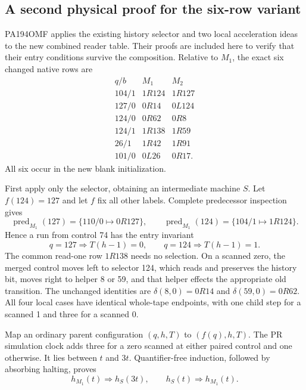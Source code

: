 \subsection{A second physical proof for the six-row variant}

PA194OMF applies the existing history selector and two local acceleration
ideas to the new combined reader table.  Their proofs are included here
to verify that their entry conditions survive the composition.  Relative
to $M_1$, the exact six changed native rows are
\[
\begin{array}{c|cc}
q/b&M_1&M_2\\\hline
104/1&1R124&1R127\\
127/0&0R14&0L124\\
124/0&0R62&0R8\\
124/1&1R138&1R59\\
26/1&1R42&1R91\\
101/0&0L26&0R17.
\end{array}                                                  \tag{OM18}
\]
All six occur in the new blank initialization.

First apply only the selector, obtaining an intermediate machine $S$.
Let $f(124)=127$ and let $f$ fix all other labels.  Complete predecessor
inspection gives
\[
 \operatorname{pred}_{M_1}(127)=\{110/0\mapsto0R127\},\qquad
 \operatorname{pred}_{M_1}(124)=\{104/1\mapsto1R124\}.
\]
Hence a run from control 74 has the entry invariant
\[
 q=127\Rightarrow T(h-1)=0,
 \qquad q=124\Rightarrow T(h-1)=1.
\]
The common read-one row $1R138$ needs no selection.  On a scanned zero,
the merged control moves left to selector 124, which reads and preserves
the history bit, moves right to helper 8 or 59, and that helper effects
the appropriate old transition.  The unchanged identities are
$\delta(8,0)=0R14$ and $\delta(59,0)=0R62$.
All four local cases have identical whole-tape endpoints, with one child
step for a scanned 1 and three for a scanned 0.

Map an ordinary parent configuration $(q,h,T)$ to $(f(q),h,T)$.
The PR simulation clock adds three for a zero scanned at either paired
control and one otherwise.  It lies between $t$ and $3t$.
Quantifier-free induction, followed by absorbing halting, proves
\[
       h_{M_1}(t)\Rightarrow h_S(3t),\qquad
       h_S(t)\Rightarrow h_{M_1}(t).                        \tag{OM19}
\]

